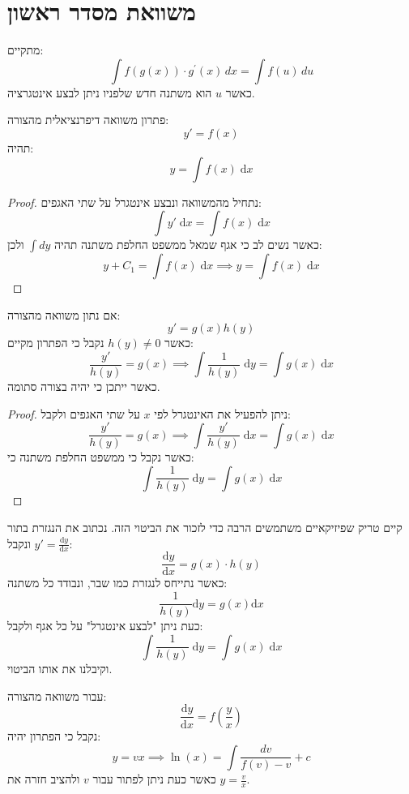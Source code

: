 \documentclass{tstextbook}
\begin{document}
\section{משוואת מסדר ראשון}

\begin{reminder}
מתקיים:
$$\int f(g(x))\cdot g^{\prime}(x)\,d x=\int f(u)\,d u$$
כאשר \(u\) הוא משתנה חדש שלפניו ניתן לבצע אינטגרציה.

\end{reminder}
\begin{proposition}
פתרון משוואה דיפרנציאלית מהצורה:
$$y'=f(x)$$
תהיה:
$$y=\int f(x) \;\mathrm{d}x$$

\end{proposition}
\begin{proof}
נתחיל מהמשוואה ונבצע אינטגרל על שתי האגפים:
$$\int y'\; \mathrm{d}x=\int f(x)\;\mathrm{d}x$$
כאשר נשים לב כי אגף שמאל ממשפט החלפת משתנה תהיה \(\int dy\) ולכן:
$$y+C_{1}=\int f(x)\;\mathrm{d}x\implies y = \int f(x) \;\mathrm{d} x $$

\end{proof}
\begin{proposition}
אם נתון משוואה מהצורה:
$$y' = g(x)h(y)$$
כאשר \(h(y)\neq 0\) נקבל כי הפתרון מקיים:
$$\frac{y'}{h(y)}=g(x)\implies \int \frac{1}{h(y)} \;\mathrm{d} y =\int g(x)\;\mathrm{d}x$$
כאשר ייתכן כי יהיה בצורה סתומה.

\end{proposition}
\begin{proof}
ניתן להפעיל את האינטגרל לפי \(x\) על שתי האגפים ולקבל:
$$\frac{y'}{h(y)}=g(x)\implies \int \frac{y'}{h(y)} \;\mathrm{d} x =\int g(x) \;\mathrm{d} x $$
כאשר נקבל כי ממשפט החלפת משתנה כי:
$$\int \frac{1}{h(y)} \;\mathrm{d} y =\int g(x)\;\mathrm{d}x$$

\end{proof}
\begin{remark}
קיים טריק שפיזיקאיים משתמשים הרבה כדי לזכור את הביטוי הזה. נכתוב את הנגזרת בתור \(y'=\frac{\mathrm{d} y}{\mathrm{d} x}\) ונקבל:
$$\frac{\mathrm{d} y}{\mathrm{d} x} =g(x)\cdot h(y)$$
כאשר נתייחס לנגזרת כמו שבר, ונבודד כל משתנה:
$$\frac{1}{h(y)}\mathrm{d}y=g(x)\mathrm{d}x$$
כעת ניתן "לבצע אינטגרל" על כל אגף ולקבל:
$$\int \frac{1}{h(y)} \;\mathrm{d} y =\int  g(x)\;\mathrm{d} x $$
וקיבלנו את אותו הביטוי.

\end{remark}
\begin{proposition}
עבור משוואה מהצורה:
$$\frac{\mathrm{d} y}{\mathrm{d} x} =f\left( \frac{y}{x} \right)$$
נקבל כי הפתרון יהיה:
$$y=v x\implies\ln(x)=\int{\frac{d v}{f(v)-v}}+c$$
כאשר כעת ניתן לפתור עבור \(v\) ולהציב חזרה את \(y=\frac{v}{x}\).

\end{proposition}
\end{document}
